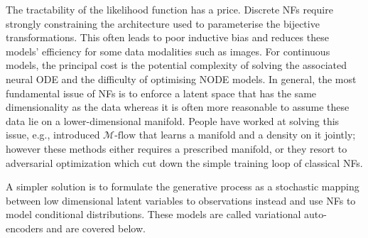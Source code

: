The tractability of the likelihood function has a price. Discrete NFs require strongly constraining the architecture used to parameterise the bijective transformations. This often leads to poor inductive bias and reduces these models' efficiency for some data modalities such as images. For continuous models, the principal cost is the potential complexity of solving the associated neural ODE and the difficulty of optimising NODE models. In general, the most fundamental issue of NFs is to enforce a latent space that has the same dimensionality as the data whereas it is often more reasonable to assume these data lie on a lower-dimensional manifold. People have worked at solving this issue, e.g., \citet{brehmer2020flows} introduced $\mathcal{M}\text{-flow}$ that learns a manifold and a density on it jointly; however these methods either requires a prescribed manifold, or they resort to adversarial optimization which cut down the simple training loop of classical NFs.

A simpler solution is to formulate the generative process as a stochastic mapping between low dimensional latent variables to observations instead and use NFs to model conditional distributions. These models are called variational auto-encoders and are covered below.

